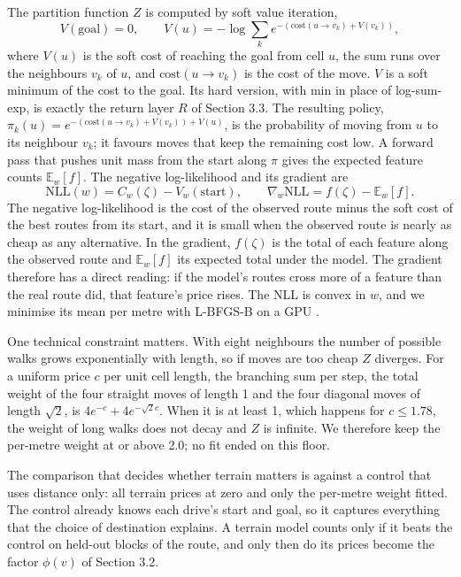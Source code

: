 \documentclass[11pt,a4paper]{article}
\begin{document}
The partition function $Z$ is computed by soft value iteration, \[V(\text{goal}) = 0,\qquad V(u) = -\log \sum_{k} e^{-(\text{cost}(u \to v_k) + V(v_k))},\] where $V(u)$ is the soft cost of reaching the goal from cell $u$, the sum runs over the neighbours $v_k$ of $u$, and $\text{cost}(u \to v_k)$ is the cost of the move. $V$ is a soft minimum of the cost to the goal. Its hard version, with min in place of log-sum-exp, is exactly the return layer $R$ of Section 3.3. The resulting policy, $\pi_k(u) = e^{-(\text{cost}(u \to v_k) + V(v_k)) + V(u)}$, is the probability of moving from $u$ to its neighbour $v_k$; it favours moves that keep the remaining cost low. A forward pass that pushes unit mass from the start along $\pi$ gives the expected feature counts $\mathbb E_w[f]$. The negative log-likelihood and its gradient are \[\mathrm{NLL}(w) = C_w(\zeta) - V_w(\text{start}),\qquad \nabla_w \mathrm{NLL} = f(\zeta) - \mathbb E_w[f].\] The negative log-likelihood is the cost of the observed route minus the soft cost of the best routes from its start, and it is small when the observed route is nearly as cheap as any alternative. In the gradient, $f(\zeta)$ is the total of each feature along the observed route and $\mathbb E_w[f]$ its expected total under the model. The gradient therefore has a direct reading: if the model's routes cross more of a feature than the real route did, that feature's price rises. The NLL is convex in $w$, and we minimise its mean per metre with L-BFGS-B \cite{SciPy} on a GPU \cite{PyTorch}.

One technical constraint matters. With eight neighbours the number of possible walks grows exponentially with length, so if moves are too cheap $Z$ diverges. For a uniform price $c$ per unit cell length, the branching sum per step, the total weight of the four straight moves of length 1 and the four diagonal moves of length $\sqrt2$, is $4e^{-c} + 4e^{-\sqrt2 c}$. When it is at least 1, which happens for $c \le 1.78$, the weight of long walks does not decay and $Z$ is infinite. We therefore keep the per-metre weight at or above 2.0; no fit ended on this floor.

The comparison that decides whether terrain matters is against a control that uses distance only: all terrain prices at zero and only the per-metre weight fitted. The control already knows each drive's start and goal, so it captures everything that the choice of destination explains. A terrain model counts only if it beats the control on held-out blocks of the route, and only then do its prices become the factor $\phi(v)$ of Section 3.2.
\end{document}
